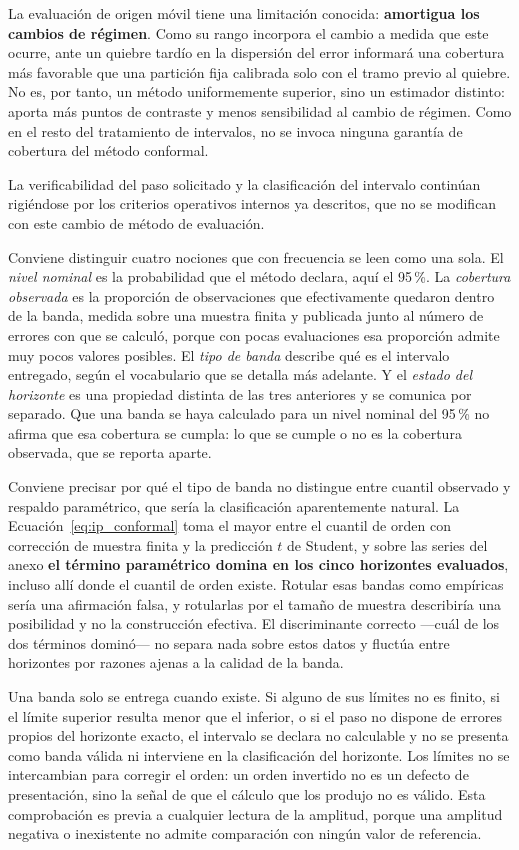\documentclass[12pt,letterpaper]{article}
\begin{document}
La evaluación de origen móvil tiene una limitación conocida: \textbf{amortigua los cambios de régimen}. Como su rango incorpora el cambio a medida que este ocurre, ante un quiebre tardío en la dispersión del error informará una cobertura más favorable que una partición fija calibrada solo con el tramo previo al quiebre. No es, por tanto, un método uniformemente superior, sino un estimador distinto: aporta más puntos de contraste y menos sensibilidad al cambio de régimen. Como en el resto del tratamiento de intervalos, no se invoca ninguna garantía de cobertura del método conformal.

La verificabilidad del paso solicitado y la clasificación del intervalo continúan rigiéndose por los criterios operativos internos ya descritos, que no se modifican con este cambio de método de evaluación.

Conviene distinguir cuatro nociones que con frecuencia se leen como una sola. El \emph{nivel nominal} es la probabilidad que el método declara, aquí el 95\,\%. La \emph{cobertura observada} es la proporción de observaciones que efectivamente quedaron dentro de la banda, medida sobre una muestra finita y publicada junto al número de errores con que se calculó, porque con pocas evaluaciones esa proporción admite muy pocos valores posibles. El \emph{tipo de banda} describe qué es el intervalo entregado, según el vocabulario que se detalla más adelante. Y el \emph{estado del horizonte} es una propiedad distinta de las tres anteriores y se comunica por separado. Que una banda se haya calculado para un nivel nominal del 95\,\% no afirma que esa cobertura se cumpla: lo que se cumple o no es la cobertura observada, que se reporta aparte.

Conviene precisar por qué el tipo de banda no distingue entre cuantil observado y respaldo paramétrico, que sería la clasificación aparentemente natural. La Ecuación~\ref{eq:ip_conformal} toma el mayor entre el cuantil de orden con corrección de muestra finita y la predicción \(t\) de Student, y sobre las series del anexo \textbf{el término paramétrico domina en los cinco horizontes evaluados}, incluso allí donde el cuantil de orden existe. Rotular esas bandas como empíricas sería una afirmación falsa, y rotularlas por el tamaño de muestra describiría una posibilidad y no la construcción efectiva. El discriminante correcto ---cuál de los dos términos dominó--- no separa nada sobre estos datos y fluctúa entre horizontes por razones ajenas a la calidad de la banda.

Una banda solo se entrega cuando existe. Si alguno de sus límites no es finito, si el límite superior resulta menor que el inferior, o si el paso no dispone de errores propios del horizonte exacto, el intervalo se declara no calculable y no se presenta como banda válida ni interviene en la clasificación del horizonte. Los límites no se intercambian para corregir el orden: un orden invertido no es un defecto de presentación, sino la señal de que el cálculo que los produjo no es válido. Esta comprobación es previa a cualquier lectura de la amplitud, porque una amplitud negativa o inexistente no admite comparación con ningún valor de referencia.
\end{document}
